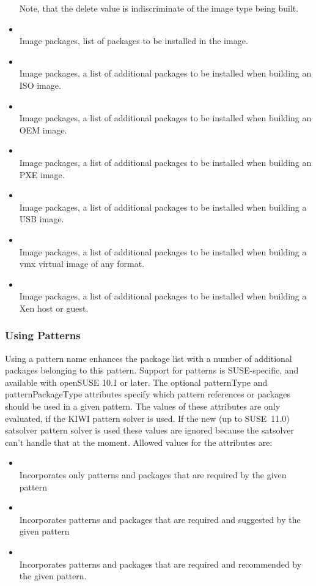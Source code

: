 \begin{itemize}
      Note, that the delete value is indiscriminate of the image type
      being built.
\item {}\\
      Image packages, list of packages to be installed in the image.
\item {}\\
      Image packages, a list of additional packages to be installed 
      when building an ISO image.
\item {}\\
      Image packages, a list of additional packages to be installed 
      when building an OEM image.
\item {}\\
      Image packages, a list of additional packages to be installed 
      when building an PXE image.
\item {}\\
      Image packages, a list of additional packages to be installed 
      when building a USB image.
\item {}\\
      Image packages, a list of additional packages to be installed 
      when building a vmx virtual image of any format.
\item {}\\
      Image packages, a list of additional packages to be installed 
      when building a Xen host or guest.
\end{itemize}

\subsubsection{Using Patterns}
Using a pattern name enhances the package list with a number of
additional packages belonging to this pattern. Support for patterns
is SUSE-specific, and available with open\-SUSE 10.1 or later.
The optional patternType and patternPackageType attributes specify
which pattern references or packages should be used in a given pattern.
The values of these attributes are only evaluated, if the KIWI pattern
solver is used. If the new (up to SUSE~11.0) satsolver pattern solver
is used these values are ignored because the satsolver can't handle
that at the moment. Allowed values for the  attributes are:

\begin{itemize}
\item {}\\
      Incorporates only patterns and packages that are required by the
      given pattern
\item {}\\
      Incorporates patterns and packages that are required
      and suggested by the given pattern
\item {}\\
      Incorporates patterns and packages that are required and
      recommended by the given pattern.
\end{itemize}

